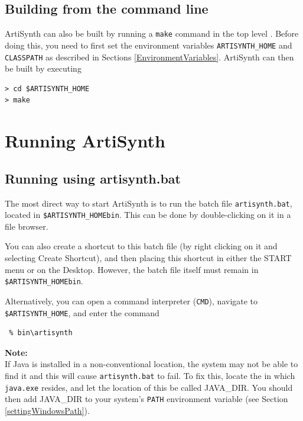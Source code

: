 \subsection{Building from the command line}
\label{BuildingWithCygwin}

ArtiSynth can also be built by running a {\tt make} command in the top
level \directory. Before doing this, you need to first set the environment
variables {\tt ARTISYNTH\_HOME} and {\tt CLASSPATH} as described in
Sections \ref{EnvironmentVariables}. ArtiSynth can then be built by
executing

\begin{verbatim}
> cd $ARTISYNTH_HOME
> make
\end{verbatim}
\fi

\section{Running ArtiSynth}
\label{Running}

\ifWindows
\subsection{Running using artisynth.bat}
\label{artisynthBat}

The most direct way to start ArtiSynth is to run the batch file
{\tt artisynth.bat}, located in {\tt \$ARTISYNTH\_HOME\SEP bin}.  This can be
done by double-clicking on it in a file browser.

You can also create a shortcut to this batch file (by right clicking
on it and selecting {\sf Create Shortcut}), and then placing this shortcut
in either the {\sf START} menu or on the Desktop. However, the batch file
itself must remain in {\tt \$ARTISYNTH\_HOME\SEP bin}.

Alternatively, you can open a command interpreter ({\tt CMD}), navigate
to {\tt \$ARTISYNTH\_HOME}, and enter the command

\begin{verbatim}
 % bin\artisynth
\end{verbatim}

\begin{sideblock}
{\bf Note:}\\
If Java is installed in a non-conventional location, the system may
not be able to find it and this will cause {\tt artisynth.bat} to fail.
To fix this, locate the \directory in which {\tt java.exe} resides, and let
the location of this \directory be called JAVA\_DIR. You should then add
JAVA\_DIR to your system's {\tt PATH} environment variable (see
Section \ref{settingWindowsPath}).  
\end{sideblock}
\else
